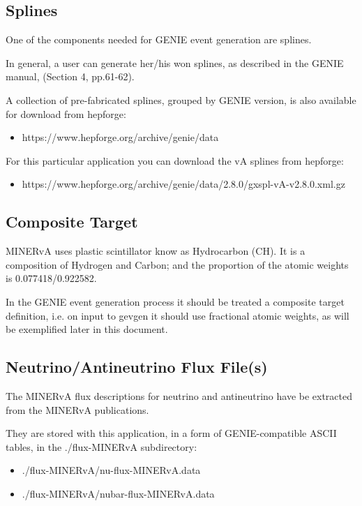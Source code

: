 \subsection{Splines}

One of the components needed for GENIE event generation are splines.

In general, a user can generate her/his won splines, as described in the GENIE manual\cite{geniemanual}, 
(Section 4, pp.61-62).

A collection of pre-fabricated splines, grouped by GENIE version, is also available for download from hepforge:
\begin{itemize}
\item{https://www.hepforge.org/archive/genie/data}
\end{itemize} 


For this particular application you can download the vA splines from hepforge:
\begin{itemize}
\item{https://www.hepforge.org/archive/genie/data/2.8.0/gxspl-vA-v2.8.0.xml.gz}
\end{itemize}

\subsection{Composite Target}
  
MINERvA uses plastic scintillator know as Hydrocarbon (CH).
It is a composition of Hydrogen and Carbon; and the proportion of the atomic weights is 0.077418/0.922582. 

In the GENIE event generation process it should be treated a composite target definition, i.e. on input 
to gevgen it should use fractional atomic weights, as will be exemplified later in this document.

\subsection{Neutrino/Antineutrino Flux File(s)}
  
The MINERvA flux descriptions for neutrino and antineutrino have be extracted from the MINERvA 
publications\cite{minerva1}.

They are stored with this application, in a form of GENIE-compatible ASCII tables, in the ./flux-MINERvA subdirectory:
\begin{itemize} 
\item{./flux-MINERvA/nu-flux-MINERvA.data}
\item{./flux-MINERvA/nubar-flux-MINERvA.data}
\end{itemize}

